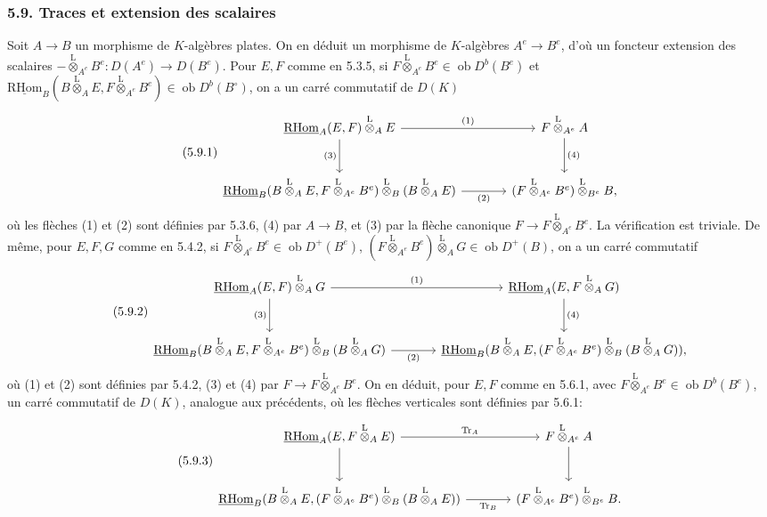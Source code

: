 \documentclass[11pt]{article}
\newcommand{\R}{\mathrm{R}}\newcommand{\RHomCore}{\mathrm{RHom}}
\newcommand{\ob}{\operatorname{ob}}
\providecommand{\RHom}{\RHomCore}
\providecommand{\uRHom}{\underline{\RHom}}
\providecommand{\Tr}{\operatorname{Tr}}
\providecommand{\Tr}{\operatorname{Tr}}
\providecommand{\lten}{\overset{\mathrm L}{\otimes}}
\providecommand{\Tr}{\operatorname{Tr}}
\providecommand{\RHom}{\RHomCore}
\providecommand{\ob}{\operatorname{ob}}
\providecommand{\lten}{\overset{\mathrm L}{\otimes}}
\providecommand{\RHom}{\R\mathcal{H}om}
\providecommand{\lten}{\overset{\mathrm L}{\otimes}}
\providecommand{\R}{\mathrm R}
\providecommand{\Tr}{\operatorname{Tr}}
\providecommand{\lten}{\overset{\mathrm L}{\otimes}}
\providecommand{\lten}{\overset{\mathrm L}{\otimes}}
\providecommand{\lten}{\overset{\mathrm L}{\otimes}}
\providecommand{\RHom}{\RHomCore}
\providecommand{\Tr}{\operatorname{Tr}}
\providecommand{\lten}{\overset{\mathrm L}{\otimes}}
\begin{document}
\subsubsection*{5.9. Traces et extension des scalaires}

Soit $A\to B$ un morphisme de $K$-algèbres plates. On en déduit un morphisme de $K$-algèbres $A^e\to B^e$, d'où un foncteur extension des scalaires $-\lten_{A^e}B^e:D(A^e)\to D(B^e)$. Pour $E,F$ comme en 5.3.5, si $F\lten_{A^e}B^e\in\ob D^b(B^e)$ et $\uRHom_B(B\lten_AE,F\lten_{A^e}B^e)\in\ob D^b(B^\circ)$, on a un carré commutatif de $D(K)$
\begin{equation}\tag{5.9.1}
\begin{tikzcd}[column sep=large,row sep=large]
\uRHom_A(E,F)\lten_AE \arrow[r,"(1)"] \arrow[d,"(3)"'] & F\lten_{A^e}A \arrow[d,"(4)"]\\
\uRHom_B(B\lten_AE,F\lten_{A^e}B^e)\lten_B(B\lten_AE) \arrow[r,"(2)"'] & (F\lten_{A^e}B^e)\lten_{B^e}B,
\end{tikzcd}
\end{equation}
où les flèches (1) et (2) sont définies par 5.3.6, (4) par $A\to B$, et (3) par la flèche canonique $F\to F\lten_{A^e}B^e$. La vérification est triviale. De même, pour $E,F,G$ comme en 5.4.2, si $F\lten_{A^e}B^e\in\ob D^+(B^e)$, $(F\lten_{A^e}B^e)\lten_AG\in\ob D^+(B)$, on a un carré commutatif
\begin{equation}\tag{5.9.2}
\begin{tikzcd}[column sep=large,row sep=large]
\uRHom_A(E,F)\lten_AG \arrow[r,"(1)"] \arrow[d,"(3)"'] & \uRHom_A(E,F\lten_AG) \arrow[d,"(4)"]\\
\uRHom_B(B\lten_AE,F\lten_{A^e}B^e)\lten_B(B\lten_AG) \arrow[r,"(2)"'] & \uRHom_B(B\lten_AE,(F\lten_{A^e}B^e)\lten_B(B\lten_AG)),
\end{tikzcd}
\end{equation}
où (1) et (2) sont définies par 5.4.2, (3) et (4) par $F\to F\lten_{A^e}B^e$. On en déduit, pour $E,F$ comme en 5.6.1, avec $F\lten_{A^e}B^e\in\ob D^b(B^e)$, un carré commutatif de $D(K)$, analogue aux précédents, où les flèches verticales sont définies par 5.6.1:
\begin{equation}\tag{5.9.3}
\begin{tikzcd}[column sep=large,row sep=large]
\uRHom_A(E,F\lten_AE) \arrow[r,"\Tr_A"] \arrow[d] & F\lten_{A^e}A \arrow[d]\\
\uRHom_B(B\lten_AE,(F\lten_{A^e}B^e)\lten_B(B\lten_AE)) \arrow[r,"\Tr_B"'] & (F\lten_{A^e}B^e)\lten_{B^e}B.
\end{tikzcd}
\end{equation}
\end{document}
